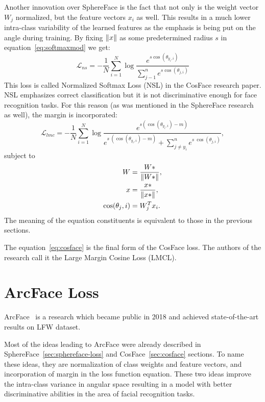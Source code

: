 Another innovation over SphereFace is the fact that not only is the weight vector $W_j$ normalized, but the feature
vectors $x_i$ as well.
This results in a much lower intra-class variability of the learned features as the emphasis is being put on the
angle during training.
By fixing $\left\lVert x\right\rVert$ as some predetermined radius $s$ in equation~\ref{eq:softmaxmod} we get:
\begin{equation}
    \mathcal{L}_{ns} = -\frac{1}{N} \sum_{i=1}^{N} \log \frac{e^{s \cos(\theta_{y_i,i})}}
    {\sum_{j-1}^{n} e^{s \cos(\theta_{j,i})}}
\end{equation}
This loss is called Normalized Softmax Loss (NSL) in the CosFace research paper.
NSL emphasizes correct classification but it is not discriminative enough for face recognition tasks.
For this reason (as was mentioned in the SphereFace research as well), the margin is incorporated:
\begin{equation}
    \label{eq:cosface}
    \mathcal{L}_{lmc} = -\frac{1}{N} \sum_{i=1}^{N} \log \frac{e^{s \left( \cos(\theta_{y_i,i}) - m \right)}}
    {e^{s\ \left( \cos(\theta_{y_i,i}) - m \right)} + \sum_{j \neq y_i}^n e^{s\ \cos(\theta_{j,i})}},
\end{equation}
subject to
\begin{align}
    W &= \frac{W*}{\left\lVert W*\right\rVert}, \\
    x &= \frac{x*}{\left\lVert x*\right\rVert}, \\
    \cos(\theta_j, i) &= W_{j}^T x_i.
\end{align}
The meaning of the equation constituents is equivalent to those in the previous sections.

The equation~\ref{eq:cosface} is the final form of the CosFace loss.
The authors of the research call it the Large Margin Cosine Loss (LMCL).

\section{ArcFace Loss}\label{sec:arcface}
ArcFace~\cite{ArcFace} is a research which became public in 2018 and achieved state-of-the-art results on LFW dataset.

Most of the ideas leading to ArcFace were already described in SphereFace~\ref{sec:sphereface-loss} and
CosFace~\ref{sec:cosface} sections.
To name these ideas, they are normalization of class weights and feature vectors, and incorporation of margin
in the loss function equation.
These two ideas improve the intra-class variance in angular space resulting in a model with better discriminative
abilities in the area of facial recognition tasks.

